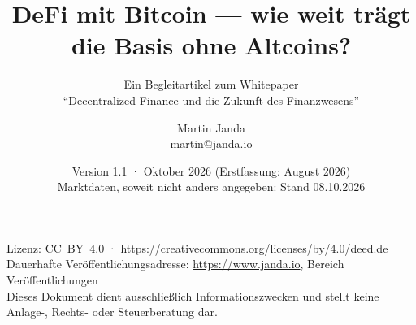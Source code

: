 \documentclass[12pt,a4paper,oneside]{scrartcl}
\title{DeFi mit Bitcoin --- wie weit trägt die Basis ohne Altcoins?}
\subtitle{Ein Begleitartikel zum Whitepaper\\
  \enquote{Decentralized Finance und die Zukunft des Finanzwesens}}
\author{Martin Janda\\\normalsize martin@janda.io}
\date{Version 1.1 · Oktober 2026 (Erstfassung: August 2026) \\ \normalsize Marktdaten, soweit nicht anders angegeben: Stand 08.10.2026}
\begin{document}

\maketitle

\begin{center}\small
  Lizenz: CC~BY~4.0 · \url{https://creativecommons.org/licenses/by/4.0/deed.de} \\
  Dauerhafte Veröffentlichungsadresse: \url{https://www.janda.io}, Bereich Veröffentlichungen \\
  Dieses Dokument dient ausschließlich Informationszwecken und stellt keine
  Anlage-, Rechts- oder Steuerberatung dar.
\end{center}
\medskip



\printbibliography
\end{document}
